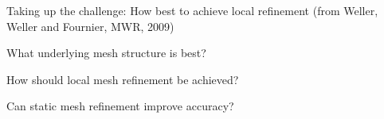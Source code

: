 \begin{slide}{Taking up the challenge:}
\vspace{20pt}
{\large How best to achieve local refinement (from Weller, Weller and Fournier, MWR, 2009)}

\begin{list0}

\item What underlying mesh structure is best?

\item How should local mesh refinement be achieved?

\item Can static mesh refinement improve accuracy?

\end{list0}

\end{slide}

